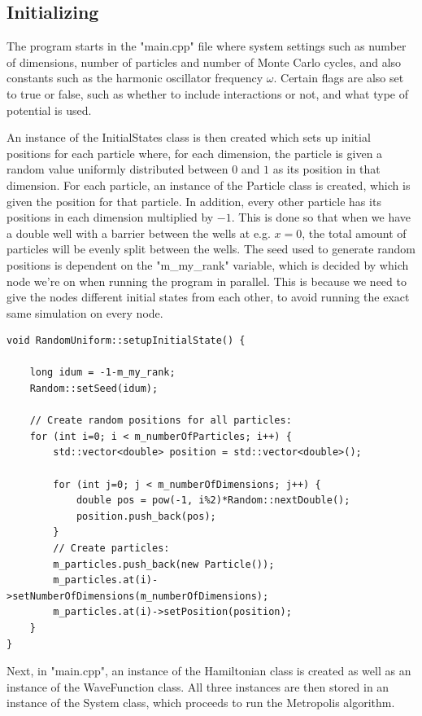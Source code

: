 \documentclass[../main.tex]{subfiles}
\begin{document}
\subsection{Initializing}

The program starts in the "main.cpp" file where system settings such as number of dimensions, number of particles and number of Monte Carlo cycles, and also constants such as the harmonic oscillator frequency $\omega$. Certain flags are also set to true or false, such as whether to include interactions or not, and what type of potential is used. 

An instance of the InitialStates class is then created which sets up initial positions for each particle where, for each dimension, the particle is given a random value uniformly distributed between $0$ and $1$ as its position in that dimension. For each particle, an instance of the Particle class is created, which is given the position for that particle. In addition, every other particle has its positions in each dimension multiplied by $-1$. This is done so that when we have a double well with a barrier between the wells at e.g. $x=0$, the total amount of particles will be evenly split between the wells. The seed used to generate random positions is dependent on the "m\_my\_rank" variable, which is decided by which node we're on when running the program in parallel. This is because we need to give the nodes different initial states from each other, to avoid running the exact same simulation on every node. 

\lstset{language=c++}
\begin{lstlisting}[title={Setting up the Initial State}]
void RandomUniform::setupInitialState() {

    long idum = -1-m_my_rank;
    Random::setSeed(idum);

    // Create random positions for all particles:
    for (int i=0; i < m_numberOfParticles; i++) {
        std::vector<double> position = std::vector<double>();

        for (int j=0; j < m_numberOfDimensions; j++) {
            double pos = pow(-1, i%2)*Random::nextDouble();
            position.push_back(pos);
        }
        // Create particles:
        m_particles.push_back(new Particle());
        m_particles.at(i)->setNumberOfDimensions(m_numberOfDimensions);
        m_particles.at(i)->setPosition(position);
    }
}
\end{lstlisting}

Next, in "main.cpp", an instance of the Hamiltonian class is created as well as an instance of the WaveFunction class. All three instances are then stored in an instance of the System class, which proceeds to run the Metropolis algorithm.
\end{document}
